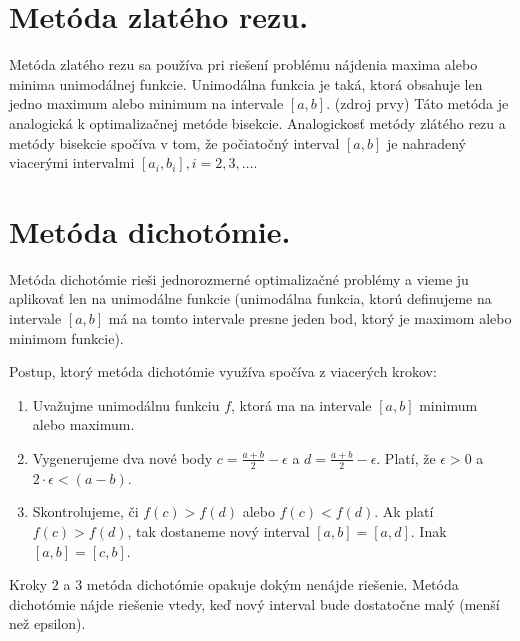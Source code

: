 \section{Metóda zlatého rezu.}
Metóda zlatého rezu sa používa pri riešení problému nájdenia maxima alebo minima unimodálnej funkcie. Unimodálna funkcia je taká, ktorá obsahuje len jedno maximum alebo minimum na intervale $[a, b]$. (zdroj prvy) \cite{} Táto metóda je analogická k optimalizačnej metóde bisekcie. Analogickosť metódy zlátého rezu a metódy bisekcie spočíva v tom, že počiatočný interval $[a, b]$ je nahradený viacerými intervalmi $[a_{i}, b_{i}], i = 2, 3,  \dots$.   \cite{lecture_optimisation} 




\section{Metóda dichotómie.}
Metóda dichotómie rieši jednorozmerné optimalizačné problémy a vieme ju aplikovať len na unimodálne funkcie (unimodálna funkcia, ktorú definujeme na intervale $[a,b]$ má na tomto intervale presne jeden bod, ktorý je maximom alebo minimom funkcie).

Postup, ktorý metóda dichotómie využíva spočíva z viacerých krokov:
\begin{enumerate}
    \item Uvažujme unimodálnu funkciu $f$, ktorá ma na intervale $[a,b]$ minimum alebo maximum.
    \item  Vygenerujeme dva nové body $c = \frac{a + b}{2} - \epsilon$ a $d = \frac{a + b}{2} - \epsilon$. Platí, že $\epsilon > 0$ a $2 \cdot \epsilon < (a - b)$.  
    \item Skontrolujeme, či $f(c) > f(d)$ alebo $f(c) < f(d)$. Ak platí $f(c) > f(d)$, tak dostaneme nový interval $[a, b] = [a, d]$. Inak $[a, b] = [c, b]$. %
\end{enumerate}
Kroky $2$ a $3$ metóda dichotómie opakuje dokým  nenájde riešenie. 
Metóda dichotómie nájde riešenie vtedy, keď nový interval bude dostatočne malý (menší než epsilon).

